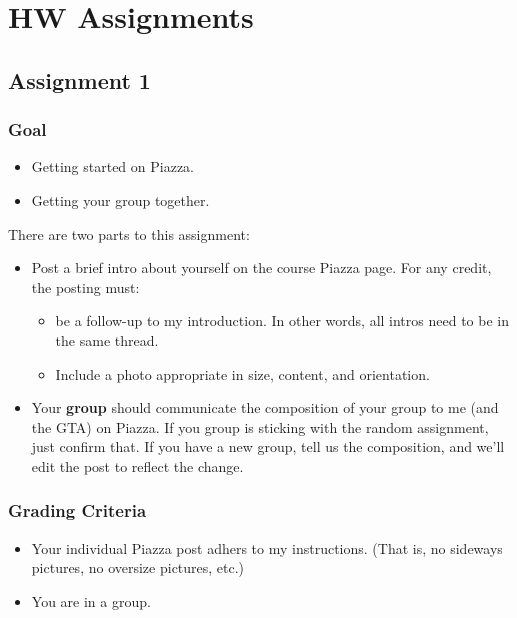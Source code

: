 \documentclass[11pt]{article}
\begin{document}
\section{HW Assignments}
\label{sec:orge6663ec}

\subsection{Assignment 1}
\label{sec:orgb85722c}
\subsubsection{Goal}
\label{sec:orgfa62630}
\begin{itemize}
\item Getting started on Piazza.
\item Getting your group together.
\end{itemize}

There are two parts to this assignment:

\begin{itemize}
\item Post a brief intro about yourself on the course Piazza page. For any credit, the posting must:
\begin{itemize}
\item be a follow-up to my introduction. In other words, all intros need to be in the same thread.
\item Include a photo appropriate in size, content, and orientation.
\end{itemize}
\item Your \textbf{group} should communicate the composition of your group to me (and the GTA) on Piazza. If you group is sticking with the random assignment, just confirm that. If you have a new group, tell us the composition, and we'll edit the post to reflect the change.
\end{itemize}

\subsubsection{Grading Criteria}
\label{sec:org3af5157}
\begin{itemize}
\item Your individual Piazza post adhers to my instructions. (That is, no sideways pictures, no oversize pictures, etc.)
\item You are in a group.
\end{itemize}
\end{document}
